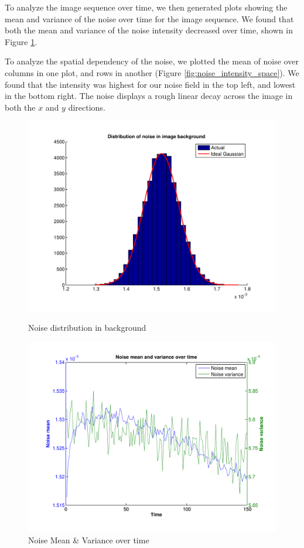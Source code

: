 \documentclass{article}
\begin{document}
To analyze the image sequence over time, we then generated plots showing the mean and variance of the noise over time for the image sequence. We found that both the mean and variance of the noise intensity decreased over time, shown in Figure \ref{fig:noise_mean_var_time}.

To analyze the spatial dependency of the noise, we plotted the mean of noise over columns in one plot, and rows in another (Figure \ref{fig:noise_intensity_space}). We found that the intensity was highest for our noise field in the top left, and lowest in the bottom right. The noise displays a rough linear decay across the image in both the $x$ and $y$ directions.

\begin{figure}[h]
\begin{minipage}[h]{0.45\linewidth}
\centering
\includegraphics[width=\textwidth]{figures/noise_distribution.pdf}
\caption{Noise distribution in background}
\label{fig:noise_dist_background}
\end{minipage}
\hspace{0.5cm}
\begin{minipage}[h]{0.45\linewidth}
\centering
\includegraphics[width=\textwidth]{figures/noise_over_time.pdf}
\caption{Noise Mean \& Variance over time}
\label{fig:noise_mean_var_time}
\end{minipage}
\end{figure}
\end{document}
